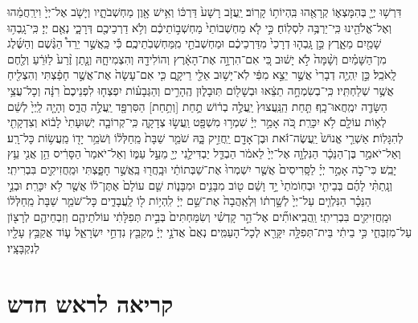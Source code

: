 \documentclass[twoside, openany, parskip=half, 11pt]{book}
\begin{document}
\begin{footnotesize}
\begin{multicols}{2}
דִּרְשׁ֥וּ יְיָ֖ בְּהִמָּצְא֑וֹ קְרָאֻ֖הוּ בִּֽהְיוֹת֥וֹ קָרֽוֹב׃ יַֽעֲזֹ֤ב רָשָׁע֙ דַּרְכּ֔וֹ וְאִ֥ישׁ אָ֖וֶן מַחְשְׁבֹתָ֑יו וְיָשֹׁ֤ב אֶל־יְיָ֙ וִירַֽחֲמֵ֔הוּ וְאֶל־אֱלֹהֵ֖ינוּ כִּֽי־יַרְבֶּ֥ה לִסְלֽוֹחַ׃ כִּ֣י לֹ֤א מַחְשְׁבוֹתַי֙ מַחְשְׁב֣וֹתֵיכֶ֔ם וְלֹ֥א דַרְכֵיכֶ֖ם דְּרָכָ֑י נְאֻ֖ם יְיָ׃ כִּֽי־גָֽבְה֥וּ שָׁמַ֖יִם מֵאָ֑רֶץ כֵּ֣ן גָּֽבְה֤וּ דְרָכַי֙ מִדַּרְכֵיכֶ֔ם וּמַחְשְׁבֹתַ֖י מִֽמַּחְשְׁבֹֽתֵיכֶֽם׃ כִּ֡י כַּֽאֲשֶׁ֣ר יֵרֵד֩ הַגֶּ֨שֶׁם וְהַשֶּׁ֜לֶג מִן־הַשָּׁמַ֗יִם וְשָׁ֨מָּה֙ לֹ֣א יָשׁ֔וּב כִּ֚י אִם־הִרְוָ֣ה אֶת־הָאָ֔רֶץ וְהוֹלִידָ֖הּ וְהִצְמִיחָ֑הּ וְנָ֤תַן זֶ֨רַע֙ לַזֹּרֵ֔עַ וְלֶ֖חֶם לָֽאֹכֵֽל׃ כֵּ֣ן יִֽהְיֶ֤ה דְבָרִי֙ אֲשֶׁ֣ר יֵצֵ֣א מִפִּ֔י לֹֽא־יָשׁ֥וּב אֵלַ֖י רֵיקָ֑ם כִּ֤י אִם־עָשָׂה֙ אֶת־אֲשֶׁ֣ר חָפַ֔צְתִּי וְהִצְלִ֖יחַ אֲשֶׁ֥ר שְׁלַחְתִּֽיו׃ כִּֽי־בְשִׂמְחָ֣ה תֵצֵ֔אוּ וּבְשָׁל֖וֹם תּֽוּבָל֑וּן הֶֽהָרִ֣ים וְהַגְּבָע֗וֹת יִפְצְח֤וּ לִפְנֵיכֶם֙ רִנָּ֔ה וְכָל־עֲצֵ֥י הַשָּׂדֶ֖ה יִמְֽחֲאוּ־כָֽף׃ תַּ֤חַת הַֽנַּֽעֲצוּץ֙ יַֽעֲלֶ֣ה בְר֔וֹשׁ תְַ֥חַת [וְתַ֥חַת] הַסִּרְפָּ֖ד יַֽעֲלֶ֣ה הֲדַ֑ס וְהָיָ֤ה לַֽיְיָ֙ לְשֵׁ֔ם לְא֥וֹת עוֹלָ֖ם לֹ֥א יִכָּרֵֽת׃ כֹּ֚ה אָמַ֣ר יְיָ֔ שִׁמְר֥וּ מִשְׁפָּ֖ט וַֽעֲשׂ֣וּ צְדָקָ֑ה כִּֽי־קְרוֹבָ֤ה יְשֽׁוּעָתִי֙ לָב֔וֹא וְצִדְקָתִ֖י לְהִגָּלֽוֹת׃ אַשְׁרֵ֤י אֱנוֹשׁ֙ יַֽעֲשֶׂה־זֹּ֔את וּבֶן־אָדָ֖ם יַֽחֲזִ֣יק בָּ֑הּ שֹׁמֵ֤ר שַׁבָּת֙ מֵֽחַלְּל֔וֹ וְשֹׁמֵ֥ר יָד֖וֹ מֵֽעֲשׂ֥וֹת כָּל־רָֽע׃ וְאַל־יֹאמַ֣ר בֶּן־הַנֵּכָ֔ר הַנִּלְוָ֤ה אֶל־יְיָ֙ לֵאמֹ֔ר הַבְדֵּ֧ל יַבְדִּילַ֛נִי יְיָ֖ מֵעַ֣ל עַמּ֑וֹ וְאַל־יֹאמַר֙ הַסָּרִ֔יס הֵ֥ן אֲנִ֖י עֵ֥ץ יָבֵֽשׁ׃ כִּי־כֹ֣ה אָמַ֣ר יְיָ֗ לַסָּֽרִיסִים֙ אֲשֶׁ֤ר יִשְׁמְרוּ֙ אֶת־שַׁבְּתוֹתַ֔י וּבָֽחֲר֖וּ בַּֽאֲשֶׁ֣ר חָפָ֑צְתִּי וּמַֽחֲזִיקִ֖ים בִּבְרִיתִֽי׃ וְנָֽתַתִּ֨י לָהֶ֜ם בְּבֵיתִ֤י וּבְחֽוֹמֹתַי֙ יָ֣ד וָשֵׁ֔ם ט֖וֹב מִבָּנִ֣ים וּמִבָּנ֑וֹת שֵׁ֤ם עוֹלָם֙ אֶתֶּן־ל֔וֹ אֲשֶׁ֖ר לֹ֥א יִכָּרֵֽת׃ וּבְנֵ֣י הַנֵּכָ֗ר הַנִּלְוִ֤ים עַל־יְיָ֙ לְשָׁ֣רְת֔וֹ וּֽלְאַֽהֲבָה֙ אֶת־שֵׁ֣ם יְיָ֔ לִֽהְי֥וֹת ל֖וֹ לַֽעֲבָדִ֑ים כָּל־שֹׁמֵ֤ר שַׁבָּת֙ מֵֽחַלְּל֔וֹ וּמַֽחֲזִיקִ֖ים בִּבְרִיתִֽי׃ וַֽהֲבִֽיאוֹתִ֞ים אֶל־הַ֣ר קָדְשִׁ֗י וְשִׂמַּחְתִּים֙ בְּבֵ֣ית תְּפִלָּתִ֔י עוֹלֹתֵיהֶ֧ם וְזִבְחֵיהֶ֛ם לְרָצ֖וֹן עַל־מִזְבְּחִ֑י כִּ֣י בֵיתִ֔י בֵּית־תְּפִלָּ֥ה יִקָּרֵ֖א לְכָל־הָעַמִּֽים׃ נְאֻם֙ אֲדֹנָ֣י יְיָ֔ מְקַבֵּ֖ץ נִדְחֵ֣י יִשְׂרָאֵ֑ל ע֛וֹד אֲקַבֵּ֥ץ עָלָ֖יו לְנִקְבָּצָֽיו׃

\end{multicols}

\section[ראש חדש]{קריאה לראש חדש}

\begin{multicols}{2}


\end{multicols}
\end{footnotesize}
\end{document}
